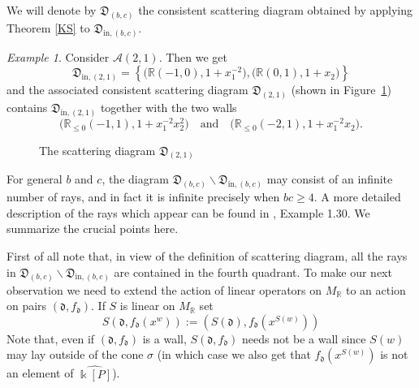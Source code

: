 \documentclass[10pt]{amsart}
\theoremstyle{remark}
\newtheorem{example}[theorem]{Example}
\numberwithin{equation}{section}
\newcommand{\RR}{\mathbb{R}}
\newcommand{\cA}{\mathcal{A}}
\newcommand{\fd}{\mathfrak{d}}
\newcommand{\fD}{\mathfrak{D}}
\begin{document}
We will denote by $\fD_{(b,c)}$ the consistent scattering diagram obtained by
applying Theorem \ref{KS} to $\fD_{\mathrm{in},(b,c)}$.

\begin{example} 
  \label{ex}
  Consider $\cA(2,1)$. Then we get
  \[
    \fD_{\mathrm{in},(2,1)} =  
    \left\{ 
      \big(\RR (-1,0), 1+x_1^{-2}\big), 
      \big(\RR (0,1), 1+x_2\big)  
    \right\}   
  \]
  and the associated consistent scattering diagram $\fD_{(2,1)}$ (shown in
  Figure~\ref{fig:diagex}) contains $\fD_{\mathrm{in},(2,1)}$ together with
  the two walls
  \[ 
    \big( \RR_{\leq 0} (-1,1), 1+x_1^{-2}x_2^2 \big)
    \quad \mbox{and} \quad
    \big( \RR_{\leq 0} (-2,1), 1+x_1^{-2}x_2 \big).
  \]
\end{example}

\begin{figure}
  \centering
  \caption{The scattering diagram $\fD_{(2,1)}$} 
  \label{fig:diagex}
\end{figure}

For general $b$ and $c$, the diagram $\fD_{(b,c)} \backslash
\fD_{\mathrm{in},(b,c)}$ may consist of an infinite number of rays, and in fact
it is infinite precisely when $bc\ge 4$. A more detailed description of the rays
which appear can be found in \cite{GHKK}, Example 1.30. We summarize the crucial
points here.

First of all note that, in view of the definition of scattering diagram, all the
rays in  $\fD_{(b,c)} \backslash \fD_{\mathrm{in},(b,c)}$ are contained in the
fourth quadrant.  To make our next observation we need to extend the action of
linear operators on $M_\RR$ to an action on pairs $(\fd,f_\fd)$. If $S$ is
linear on $M_\RR$ set
\begin{equation}
  \label{eqn:linear action}
  S(\fd,f_\fd(x^w))
  :=
  \left( S(\fd), f_\fd\left(x^{S(w)}\right) \right)
\end{equation}
Note that, even if $(\fd,f_\fd)$ is a wall, $S(\fd,f_\fd)$ needs not be a wall
since $S(w)$ may lay outside of the cone $\sigma$ (in which case we also get
that  $f_\fd\left(x^{S(w)}\right)$ is not an element of $\widehat{\Bbbk [P]}$).
\end{document}
